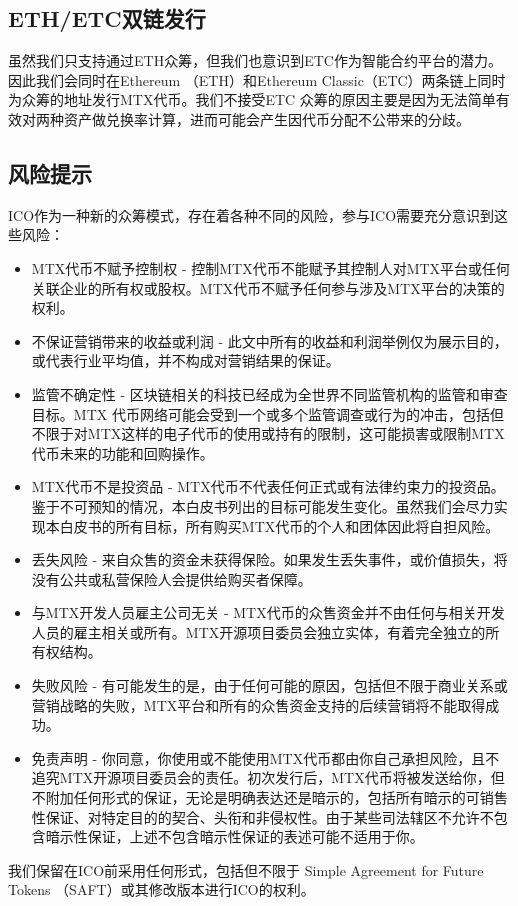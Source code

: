 \documentclass[UTF8,nofonts]{ctexart}
\begin{document}
\begin{appendices}
\subsection{ETH/ETC双链发行\label{sec:chains}}

虽然我们只支持通过ETH众筹，但我们也意识到ETC作为智能合约平台的潜力。因此我们会同时在Ethereum （ETH）和Ethereum Classic（ETC）两条链上同时为众筹的地址发行MTX代币。我们不接受ETC 众筹的原因主要是因为无法简单有效对两种资产做兑换率计算，进而可能会产生因代币分配不公带来的分歧。


\subsection{风险提示\label{sec:risks}}

ICO作为一种新的众筹模式，存在着各种不同的风险，参与ICO需要充分意识到这些风险：
\begin{itemize}
	\item MTX代币不赋予控制权 - 控制MTX代币不能赋予其控制人对MTX平台或任何关联企业的所有权或股权。MTX代币不赋予任何参与涉及MTX平台的决策的权利。
	\item 不保证营销带来的收益或利润 - 此文中所有的收益和利润举例仅为展示目的，或代表行业平均值，并不构成对营销结果的保证。
	\item 监管不确定性 - 区块链相关的科技已经成为全世界不同监管机构的监管和审查目标。MTX 代币网络可能会受到一个或多个监管调查或行为的冲击，包括但不限于对MTX这样的电子代币的使用或持有的限制，这可能损害或限制MTX代币未来的功能和回购操作。
	\item MTX代币不是投资品 - MTX代币不代表任何正式或有法律约束力的投资品。鉴于不可预知的情况，本白皮书列出的目标可能发生变化。虽然我们会尽力实现本白皮书的所有目标，所有购买MTX代币的个人和团体因此将自担风险。
	\item 丢失风险 - 来自众售的资金未获得保险。如果发生丢失事件，或价值损失，将没有公共或私营保险人会提供给购买者保障。
	\item 与MTX开发人员雇主公司无关 - MTX代币的众售资金并不由任何与相关开发人员的雇主相关或所有。MTX开源项目委员会独立实体，有着完全独立的所有权结构。
	\item 失败风险 - 有可能发生的是，由于任何可能的原因，包括但不限于商业关系或营销战略的失败，MTX平台和所有的众售资金支持的后续营销将不能取得成功。
	\item 免责声明 - 你同意，你使用或不能使用MTX代币都由你自己承担风险，且不追究MTX开源项目委员会的责任。初次发行后，MTX代币将被发送给你，但不附加任何形式的保证，无论是明确表达还是暗示的，包括所有暗示的可销售性保证、对特定目的的契合、头衔和非侵权性。由于某些司法辖区不允许不包含暗示性保证，上述不包含暗示性保证的表述可能不适用于你。
\end{itemize}


我们保留在ICO前采用任何形式，包括但不限于 Simple Agreement for Future Tokens （SAFT）或其修改版本进行ICO的权利。

\end{appendices}
\end{document}
